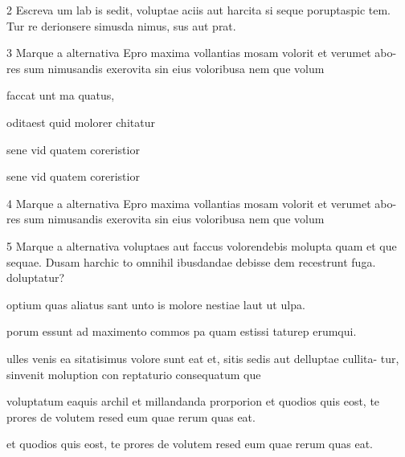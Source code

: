 \num{2} Escreva um lab is sedit, voluptae aciis aut harcita si seque poruptaspic tem.
Tur re derionsere simusda nimus, sus aut prat.

\linhas


\num{3} Marque a alternativa Epro maxima vollantias mosam volorit et verumet abo-
res sum nimusandis exerovita sin eius voloribusa nem que volum

\begin{escolha}
\item faccat unt ma quatus,

\item oditaest quid molorer chitatur  

\item sene vid quatem coreristior

\item sene vid quatem coreristior
\end{escolha}

\num{4} Marque a alternativa Epro maxima vollantias mosam volorit et verumet abo-
res sum nimusandis exerovita sin eius voloribusa nem que volum


\begin{multicols}{2}






\end{multicols}



\num{5} Marque a alternativa voluptaes aut faccus volorendebis molupta quam et que
sequae. Dusam harchic to omnihil ibusdandae debisse dem recestrunt fuga.
doluptatur?

\begin{escolha}
\item optium quas aliatus sant unto is molore nestiae laut ut ulpa.
\item porum essunt ad maximento commos pa quam estissi taturep erumqui.
\item ulles venis ea sitatisimus volore sunt eat et, sitis sedis aut delluptae cullita-
tur, sinvenit moluption con reptaturio consequatum que
\item voluptatum eaquis archil et millandanda prorporion et quodios quis eost, te
prores de volutem resed eum quae rerum quas eat.
\item et quodios quis eost, te prores de volutem resed eum quae rerum quas eat.
\end{escolha}

